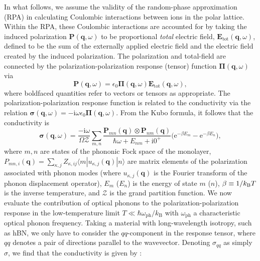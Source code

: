 \documentclass[aps,prb,twocolumn,
	           groupedaddress,superscriptaddress,
               amsfonts,amssymb,amsmath,floatfix,
	           citeautoscript]{revtex4-1}
\newcommand{\iu}{\mathrm{i}}
\newcommand{\e}{\mathrm{e}}
\begin{document}
In what follows, we assume the validity of the random-phase approximation (RPA) in calculating Coulombic interactions between ions in the polar lattice. Within the RPA, these Coulombic interactions are accounted for by taking the induced polarization $\mathbf{P}(\mathbf{q},\omega)$ to be proportional \emph{total} electric field, $\mathbf{E}_{\mathrm{tot}}(\mathbf{q},\omega)$, defined to be the sum of the externally applied electric field and the electric field created by the induced polarization. The polarization and total-field are connected by the polarization-polarization response (tensor) function  $\boldsymbol{\Pi}(\mathbf{q},\omega)$ via
\begin{equation}
\mathbf{P}(\mathbf{q},\omega)  = \epsilon_0\boldsymbol{\Pi}(\mathbf{q},\omega)\mathbf{E}_{\mathrm{tot}}(\mathbf{q},\omega),
\end{equation}
where boldfaced quantities refer to vectors or tensors as appropriate. The polarization-polarization response function is related to the conductivity via the relation $\boldsymbol{\sigma}(\mathbf{q},\omega) = -\iu\omega\epsilon_0\boldsymbol{\Pi}(\mathbf{q},\omega)$. From the Kubo formula, it follows that the conductivity is
\begin{equation}\label{eq:2dsusceptibility}
    \boldsymbol{\sigma}(\mathbf{q},\omega) =  \frac{-\iu \omega}{ \Omega\mathcal{Z}}\sum\limits_{m,n}\frac{\mathbf{P}_{mn}(\mathbf{q})\otimes\mathbf{P}_{nm}(\mathbf{q})}{\hbar\omega + E_{nm}+\iu 0^+}\Big(\e^{-\beta E_m}-\e^{-\beta E_n} \Big),
\end{equation}
where $m,n$ are states of the phononic Fock space of the monolayer, $P_{mn,i}(\mathbf{q}) = \sum_{\kappa,j}Z_{\kappa,ij}\langle m | u_{\kappa,j}(\mathbf{q}) | n \rangle$ are matrix elements of the polarization associated with phonon modes (where $u_{\kappa,j}(\mathbf{q})$ is the Fourier transform of the phonon displacement operator), $E_{m}$ ($E_n$) is the energy of state $m$ ($n$), $\beta \equiv 1/k_{\text{\textsc{B}}}T$ is the inverse temperature, and $\mathcal{Z}$ is the grand partition function. We now evaluate the contribution of optical phonons to the polarization-polarization response in the low-temperature limit $T \ll \hbar\omega_{\mathrm{ph}}/k_{\mathrm{B}}$ with $\omega_{\mathrm{ph}}$ a characteristic optical phonon frequency.  Taking a material with long-wavelength isotropy, such as hBN, we only have to consider the $qq$-component in the response tensor, where $qq$ denotes a pair of directions parallel to the wavevector. Denoting $\sigma_{qq}$ as simply $\sigma$, we find that the conductivity is given by \cite{rivera2018ab}: 
\end{document}
